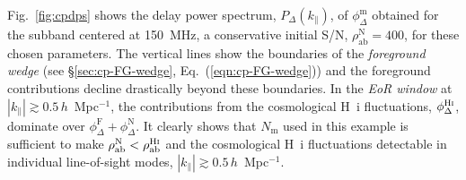 \documentclass[
reprint,
superscriptaddress,
amsmath,
amssymb,
aps,
prd
]{revtex4-1}
\begin{document}
Fig.~\ref{fig:cpdps} shows the delay power spectrum, $P_\Delta(k_\parallel)$, of $\phi_\Delta^\textrm{m}$ obtained for the subband centered at 150~MHz, a conservative initial S/N, $\rho_\textrm{ab}^\textrm{N}=400$,  for these chosen parameters. The vertical lines show the boundaries of the {\it foreground wedge} (see \S\ref{sec:cp-FG-wedge}, Eq.~(\ref{eqn:cp-FG-wedge})) and the foreground contributions decline drastically beyond these boundaries. In the {\it EoR window} at $|k_\parallel| \gtrsim 0.5\,h$~Mpc$^{-1}$, the contributions from the cosmological H~{\sc i} fluctuations, $\phi_\Delta^\textrm{H{\sc i}}$, dominate over $\phi_\Delta^\textrm{F} + \phi_\Delta^\textrm{N}$. It clearly shows that $N_\textrm{m}$ used in this example is sufficient to make $\rho_\textrm{ab}^\textrm{N} < \rho_\textrm{ab}^\textrm{H{\sc i}}$ and the cosmological H~{\sc i} fluctuations detectable in individual line-of-sight modes, $|k_\parallel| \gtrsim 0.5\,h$~Mpc$^{-1}$. 
\end{document}
